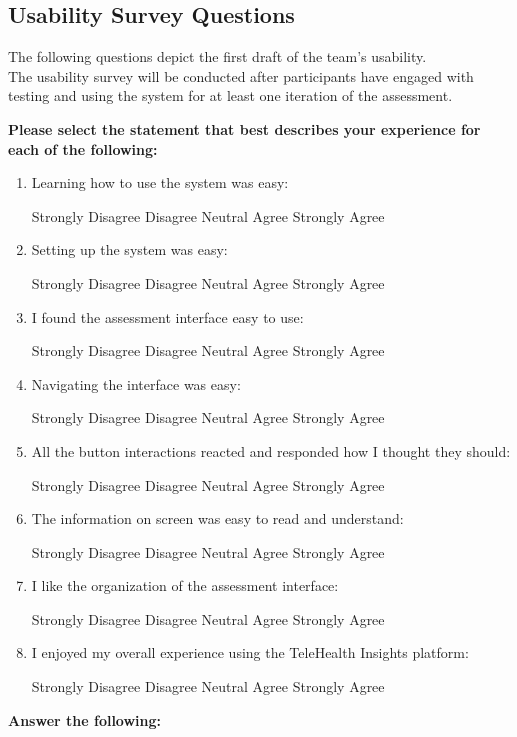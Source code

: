 \documentclass[12pt, titlepage]{article}
\begin{document}
\subsection{Usability Survey Questions}
The following questions depict the first draft of the team's usability.\\
The usability survey will be conducted after participants have engaged with testing and using the system for at least one iteration of the assessment.\\

\newcommand{\likertScale}{
    \begin{center}
        Strongly Disagree \hfill Disagree \hfill Neutral \hfill Agree \hfill Strongly Agree
    \end{center}
}

\newcommand{\insertAnswerHere}{
  \begin{tcolorbox}[width=0.5\textwidth,
    colframe=black,
    colback=white,
    boxrule=0.1mm,
    sharp corners]
  \textit{Insert answer here...}
  \end{tcolorbox}
}

\textbf{Please select the statement that best describes your experience for each of the following:}
\begin{enumerate}
  \item Learning how to use the system was easy:\likertScale
  \item Setting up the system was easy:\likertScale
  \item I found the assessment interface easy to use:\likertScale
  \item Navigating the interface was easy:\likertScale
  \item All the button interactions reacted and responded how I thought they should:\likertScale
  \item The information on screen was easy to read and understand:\likertScale
  \item I like the organization of the assessment interface:\likertScale
  \item I enjoyed my overall experience using the TeleHealth Insights platform:\likertScale
\end{enumerate}
\textbf{Answer the following:}
\end{document}
